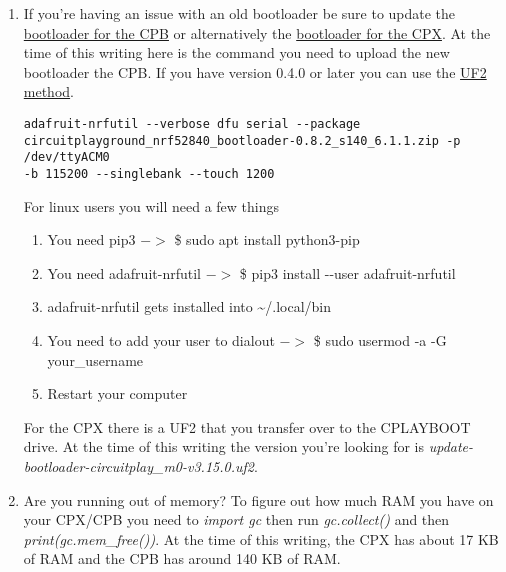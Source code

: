 \begin{enumerate}[itemsep=-5pt]
  \item If you're having an issue with an old bootloader be sure to update the \href{https://learn.adafruit.com/adafruit-circuit-playground-bluefruit/update-bootloader-use-command-line}{bootloader for the CPB} or alternatively the \href{https://learn.adafruit.com/adafruit-circuit-playground-express/updating-the-bootloader}{bootloader for the CPX}. At the time of this writing here is the command you need to upload the new bootloader the CPB. If you have version 0.4.0 or later you can use the \href{https://learn.adafruit.com/adafruit-circuit-playground-bluefruit/update-bootloader-use-uf2}{UF2 method}. 
  \begin{verbatim}adafruit-nrfutil --verbose dfu serial --package 
circuitplayground_nrf52840_bootloader-0.8.2_s140_6.1.1.zip -p /dev/ttyACM0 
-b 115200 --singlebank --touch 1200\end{verbatim}
For linux users you will need a few things
\begin{enumerate}
  \item You need pip3 $->$ \$ sudo apt install python3-pip
  \item You need adafruit-nrfutil $->$ \$ pip3 install -{}-user adafruit-nrfutil
  \item adafruit-nrfutil gets installed into \textasciitilde/.local/bin
  \item You need to add your user to dialout $->$ \$ sudo usermod -a -G your\_username
  \item Restart your computer
\end{enumerate}
  For the CPX there is a UF2 that you transfer over to the CPLAYBOOT drive. At the time of this writing the version you're looking for is {\it update-bootloader-circuitplay\_m0-v3.15.0.uf2}.
  \item Are you running out of memory? To figure out how much RAM you have on your CPX/CPB you need to {\it import gc} then run {\it gc.collect()} and then {\it print(gc.mem\_free())}. At the time of this writing, the CPX has about 17 KB of RAM and the CPB has around 140 KB of RAM. 

\end{enumerate}
